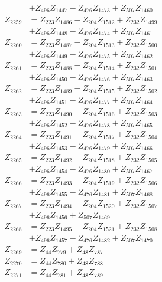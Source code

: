 \begin{multicols}{2}
\begin{align}
&+ Z_{496}Z_{1447} - Z_{476}Z_{1473} + Z_{507}Z_{1460} \nonumber \\
Z_{2259} &= Z_{223}Z_{1486} - Z_{204}Z_{1512} + Z_{232}Z_{1499}  \nonumber \\
&+ Z_{496}Z_{1448} - Z_{476}Z_{1474} + Z_{507}Z_{1461} \nonumber \\
Z_{2260} &= Z_{223}Z_{1487} - Z_{204}Z_{1513} + Z_{232}Z_{1500}  \nonumber \\
&+ Z_{496}Z_{1449} - Z_{476}Z_{1475} + Z_{507}Z_{1462} \nonumber \\
Z_{2261} &= Z_{223}Z_{1488} - Z_{204}Z_{1514} + Z_{232}Z_{1501}  \nonumber \\
&+ Z_{496}Z_{1450} - Z_{476}Z_{1476} + Z_{507}Z_{1463} \nonumber \\
Z_{2262} &= Z_{223}Z_{1489} - Z_{204}Z_{1515} + Z_{232}Z_{1502}  \nonumber \\
&+ Z_{496}Z_{1451} - Z_{476}Z_{1477} + Z_{507}Z_{1464} \nonumber \\
Z_{2263} &= Z_{223}Z_{1490} - Z_{204}Z_{1516} + Z_{232}Z_{1503}  \nonumber \\
&+ Z_{496}Z_{1452} - Z_{476}Z_{1478} + Z_{507}Z_{1465} \nonumber \\
Z_{2264} &= Z_{223}Z_{1491} - Z_{204}Z_{1517} + Z_{232}Z_{1504}  \nonumber \\
&+ Z_{496}Z_{1453} - Z_{476}Z_{1479} + Z_{507}Z_{1466} \nonumber \\
Z_{2265} &= Z_{223}Z_{1492} - Z_{204}Z_{1518} + Z_{232}Z_{1505}  \nonumber \\
&+ Z_{496}Z_{1454} - Z_{476}Z_{1480} + Z_{507}Z_{1467} \nonumber \\
Z_{2266} &= Z_{223}Z_{1493} - Z_{204}Z_{1519} + Z_{232}Z_{1506}  \nonumber \\
&+ Z_{496}Z_{1455} - Z_{476}Z_{1481} + Z_{507}Z_{1468} \nonumber \\
Z_{2267} &= Z_{223}Z_{1494} - Z_{204}Z_{1520} + Z_{232}Z_{1507}  \nonumber \\
&+ Z_{496}Z_{1456} + Z_{507}Z_{1469} \nonumber \\
Z_{2268} &= Z_{223}Z_{1495} - Z_{204}Z_{1521} + Z_{232}Z_{1508}  \nonumber \\
&+ Z_{496}Z_{1457} - Z_{476}Z_{1482} + Z_{507}Z_{1470} \nonumber \\
Z_{2269} &= Z_{44}Z_{779} + Z_{48}Z_{787} \nonumber \\
Z_{2270} &= Z_{44}Z_{780} + Z_{48}Z_{788} \nonumber \\
Z_{2271} &= Z_{44}Z_{781} + Z_{48}Z_{789} \nonumber \\

\end{align}
\end{multicols}
